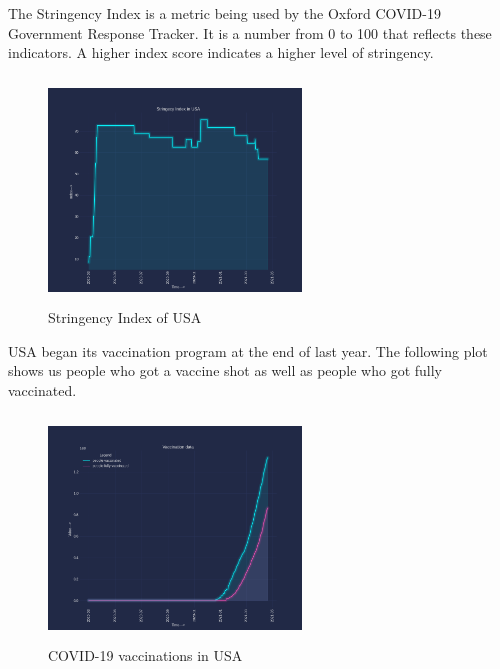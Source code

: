 \documentclass[12pt,a4paper]{article}
\begin{document}
The Stringency Index is a metric being used by the Oxford COVID-19 Government Response Tracker.
It is a number from 0 to 100 that reflects these indicators. A higher index score indicates a higher level of stringency.
\begin{figure}[H]
    \centering
    \includegraphics[width=0.6\textwidth,height=60mm]{images/usa/stringecy index.png}
    \caption{Stringency Index of USA}
\end{figure}
USA began its vaccination program at the end of last year. The following plot shows us 
people who got a vaccine shot as well as people who got fully vaccinated. 
\begin{figure}[H]
    \centering
    \includegraphics[width=0.6\textwidth,height=60mm]{images/usa/vaccination.png}
    \caption{COVID-19 vaccinations in USA}
\end{figure}
\end{document}

